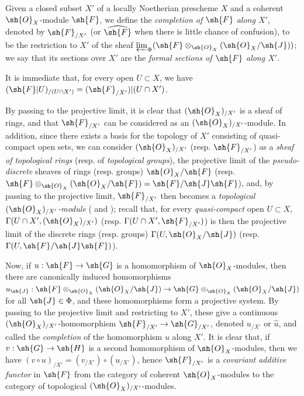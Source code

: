 \begin{definition}[10.8.4]
\label{I.10.8.4}
Given a closed subset $X'$ of a locally Noetherian prescheme $X$ and a coherent $\sh{O}_X$-module $\sh{F}$, we define the \emph{completion of $\sh{F}$ along $X'$}, denoted by $\sh{F}_{/X'}$ (or $\widehat{\sh{F}}$ when there is little chance of confusion), to be the restriction to $X'$ of the sheaf
$\varprojlim_\Phi(\sh{F}\otimes_{\sh{O}_X}(\sh{O}_X/\sh{J}))$; we say that its sections over $X'$ are the \emph{formal sections of $\sh{F}$ along $X'$}.
\end{definition}

It is immediate that, for every open $U\subset X$, we have $(\sh{F}|U)_{/(U\cap X')}=(\sh{F}_{/X'})|(U\cap X')$.

By passing to the projective limit, it is clear that $(\sh{O}_X)_{/X'}$ is a sheaf of rings, and that $\sh{F}_{/X'}$ can be considered as an $(\sh{O}_X)_{/X'}$-module.
In addition, since there exists a basis for the topology of $X'$ consisting of quasi-compact open sets, we can consider $(\sh{O}_X)_{/X'}$ (resp. $\sh{F}_{/X'}$) as a \emph{sheaf of topological rings} (resp. of \emph{topological groups}), the projective limit of the \emph{pseudo-discrete} sheaves of rings (resp. groups) $\sh{O}_X/\sh{F}$ (resp. $\sh{F}\otimes_{\sh{O}_X}(\sh{O}_X/\sh{F})=\sh{F}/\sh{J}\sh{F}$), and, by passing to the projective limit, $\sh{F}_{/X'}$ then becomes a \emph{topological $(\sh{O}_X)_{/X'}$-module} ( and ); recall that, for every \emph{quasi-compact} open $U\subset X$, $\Gamma(U\cap X',(\sh{O}_X)_{/X'})$ (resp. $\Gamma(U\cap X',\sh{F}_{/X'})$) is then the projective limit of the discrete rings (resp. groups) $\Gamma(U,\sh{O}_X/\sh{J})$ (resp. $\Gamma(U,\sh{F}/\sh{J}\sh{F})$).

Now, if $u:\sh{F}\to\sh{G}$ is a homomorphism of $\sh{O}_X$-modules, then there are canonically induced homomorphisms $u_\sh{J}:\sh{F}\otimes_{\sh{O}_X}(\sh{O}_X/\sh{J})\to\sh{G}\otimes_{\sh{O}_X}(\sh{O}_X/\sh{J})$ for all $\sh{J}\in\Phi$, and these homomorphisms form a projective system.
By passing to the projective limit and restricting to $X'$, these give a continuous $(\sh{O}_X)_{/X'}$-homomorphism $\sh{F}_{/X'}\to\sh{G}_{/X'}$, denoted $u_{/X'}$ or $\widehat{u}$, and called the \emph{completion} of the homomorphism $u$ along $X'$.
It is clear that, if $v:\sh{G}\to\sh{H}$ is a second homomorphism of $\sh{O}_X$-modules, then we have $(v\circ u)_{/X'}=(v_{/X'})\circ(u_{/X'})$, hence $\sh{F}_{/X'}$ is a \emph{covariant additive functor} in $\sh{F}$ from the category of coherent $\sh{O}_X$-modules to the category of topological $(\sh{O}_X)_{/X'}$-modules.

